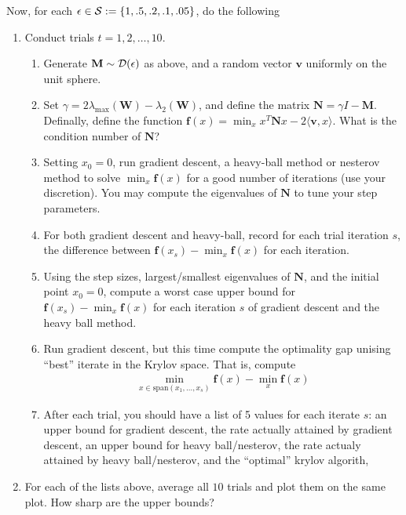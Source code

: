 \documentclass[12pt]{article}
\begin{document}
	Now, for each $\epsilon \in {\cal S} := \{1,.5,.2,.1,.05\}$, do the following
	\begin{enumerate}
		\item Conduct trials $t = 1,2,\dots,10$.
		\begin{enumerate}
		\item Generate $\mathbf{M} \sim {\cal D}(\epsilon)$ as above, and a random vector $\mathbf{v}$ uniformly on the unit sphere. 
		\item Set $\gamma = 2\lambda_{\max}(\mathbf{W}) - \lambda_{2}(\mathbf{W})$, and define the matrix $\mathbf{N} = \gamma I  - \mathbf{M}$. Definally, define the function $\mathbf{f}(x) = \min_{x} x^T \mathbf{N} x - 2 \langle \mathbf{v}, x \rangle$. What is the condition number of $\mathbf{N}$?
		\item Setting $x_0 = 0$, run gradient descent, a heavy-ball method or nesterov method to solve $\min_{x} \mathbf{f}(x)$ for a good number of iterations (use your discretion). You may compute the eigenvalues of $\mathbf{N}$ to tune your step parameters. 
		\item For both gradient descent and heavy-ball, record for each trial iteration $s$, the difference between $\mathbf{f}(x_s) - \min_{x} \mathbf{f}(x)$ for each iteration. 
		\item Using the step sizes, largest/smallest eigenvalues of $\mathbf{N}$, and the initial point $x_0 = 0$, compute a worst case upper bound for $\mathbf{f}(x_s) - \min_{x} \mathbf{f}(x)$ for each iteration $s$ of gradient descent and the heavy ball method.
		\item Run gradient descent, but this time compute the optimality gap unising ``best'' iterate in the Krylov space. That is, compute 
		\begin{eqnarray}
		\min_{x \in \mathrm{span}(x_1,\dots,x_s)}\mathbf{f}(x) - \min_{x} \mathbf{f}(x)
		\end{eqnarray}
		\item After each trial, you should have a list of 5 values for each iterate $s$: an upper bound for gradient descent, the rate actually attained by gradient descent, an upper bound for heavy ball/nesterov, the rate actualy attained by heavy ball/nesterov, and the ``optimal'' krylov algorith,
	\end{enumerate}
	\item For each of the lists above, average all $10$ trials and plot them on the same plot. How sharp are the upper bounds?
	\end{enumerate}
\end{document}
